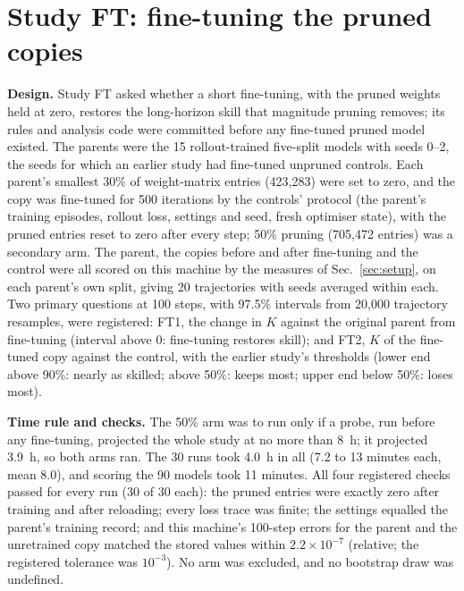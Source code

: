 \section{Study FT: fine-tuning the pruned copies}\label{app:A7}
\textbf{Design.} Study FT asked whether a short fine-tuning, with the pruned weights held at zero, restores the
long-horizon skill that magnitude pruning removes; its rules and analysis code were committed before any fine-tuned pruned model existed. The parents were the 15 rollout-trained five-split
models with seeds 0--2, the seeds for which an earlier study had fine-tuned unpruned controls. Each parent's
smallest 30\% of weight-matrix entries (423{,}283) were set to zero, and the copy was fine-tuned for
500 iterations by the controls' protocol (the parent's training episodes, rollout loss, settings and seed,
fresh optimiser state), with the pruned entries reset to zero after every step; 50\% pruning (705{,}472
entries) was a secondary arm. The parent, the copies before and after fine-tuning and the control were all scored
on this machine by the measures of Sec.~\ref{sec:setup}, on each parent's own split, giving 20
trajectories with seeds averaged within each. Two primary questions at 100 steps, with 97.5\% intervals from
20{,}000 trajectory resamples, were registered: FT1, the change in $K$ against the original parent from
fine-tuning (interval above 0: fine-tuning restores skill); and FT2, $K$ of the fine-tuned copy against the control,
with the earlier study's thresholds (lower end above 90\%: nearly as skilled; above 50\%: keeps most; upper end below
50\%: loses most).

\textbf{Time rule and checks.} The 50\% arm was to run only if a probe, run before any fine-tuning, projected the
whole study at no more than 8~h; it projected 3.9~h, so both arms ran. The
30 runs took 4.0~h in all (7.2 to 13 minutes each, mean
8.0), and scoring the 90 models took 11 minutes. All four registered checks
passed for every run (30 of 30 each): the pruned entries were exactly zero after training and after
reloading; every loss trace was finite; the settings equalled the parent's training record; and this machine's
100-step errors for the parent and the unretrained copy matched the stored values within $2.2\times10^{-7}$
(relative; the registered tolerance was $10^{-3}$). No arm was excluded, and no bootstrap draw was undefined.

